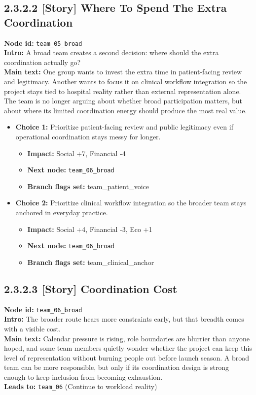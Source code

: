 \documentclass[11pt]{article}
\begin{document}
\subsection*{2.3.2.2 [Story] Where To Spend The Extra Coordination}
\textbf{Node id:} \texttt{team\_05\_broad}\\
\textbf{Intro:} A broad team creates a second decision: where should the extra coordination actually go?\\
\textbf{Main text:} One group wants to invest the extra time in patient-facing review and legitimacy. Another wants to focus it on clinical workflow integration so the project stays tied to hospital reality rather than external representation alone. The team is no longer arguing about whether broad participation matters, but about where its limited coordination energy should produce the most real value.\\
\begin{itemize}
\item \textbf{Choice 1:} Prioritize patient-facing review and public legitimacy even if operational coordination stays messy for longer.
\begin{itemize}
\item \textbf{Impact:} Social +7, Financial -4
\item \textbf{Next node:} \texttt{team\_06\_broad}
\item \textbf{Branch flags set:} team\_patient\_voice
\end{itemize}
\item \textbf{Choice 2:} Prioritize clinical workflow integration so the broader team stays anchored in everyday practice.
\begin{itemize}
\item \textbf{Impact:} Social +4, Financial -3, Eco +1
\item \textbf{Next node:} \texttt{team\_06\_broad}
\item \textbf{Branch flags set:} team\_clinical\_anchor
\end{itemize}
\end{itemize}
\subsection*{2.3.2.3 [Story] Coordination Cost}
\textbf{Node id:} \texttt{team\_06\_broad}\\
\textbf{Intro:} The broader route hears more constraints early, but that breadth comes with a visible cost.\\
\textbf{Main text:} Calendar pressure is rising, role boundaries are blurrier than anyone hoped, and some team members quietly wonder whether the project can keep this level of representation without burning people out before launch season. A broad team can be more responsible, but only if its coordination design is strong enough to keep inclusion from becoming exhaustion.\\
\textbf{Leads to:} \texttt{team\_06} (Continue to workload reality)\\
\end{document}
